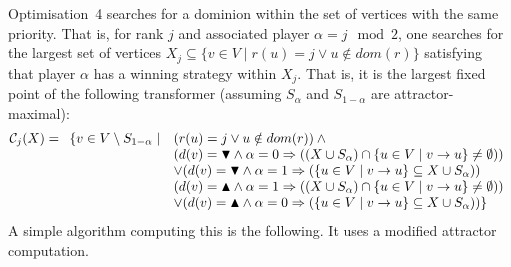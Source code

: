 \documentclass{article}
\begin{document}
Optimisation~4 searches for a dominion within the set of vertices with the same priority. That is, for rank $j$ and associated player $\alpha = j \mod 2$, one searches for the largest set of vertices $X_j \subseteq \{ v \in V \mid r(u) = j \vee u \notin dom(r)\}$ satisfying that player $\alpha$ has a winning strategy within $X_j$. That is, it is the largest fixed point of the following transformer (assuming $S_\alpha$ and $S_{1-\alpha}$ are attractor-maximal):
\[
\mathcal{C}_j(X) = 
\begin{array}[t]{ll}
\{ v \in V \setminus S_{1-\alpha} \mid & (r(u) = j \vee u \notin dom(r) ) \wedge {} \\
 & (d(v) = \blacktriangledown \wedge \alpha = 0 \Rightarrow ((X \cup S_\alpha) \cap \{u \in V \mid v \to u \} \neq \emptyset))\\
& \vee
(d(v) = \blacktriangledown \wedge \alpha = 1 \Rightarrow (\{u \in V \mid v \to u \} \subseteq X \cup S_\alpha))\\
& (d(v) = \blacktriangle \wedge \alpha = 1 \Rightarrow ((X \cup S_\alpha) \cap \{u \in V \mid v \to u \} \neq \emptyset))\\
& \vee
(d(v) = \blacktriangle \wedge \alpha = 0 \Rightarrow (\{u \in V \mid v \to u \} \subseteq X \cup S_\alpha))
\}
\end{array}
\]
A simple algorithm computing this is the following. It uses a modified
attractor computation.
\end{document}
